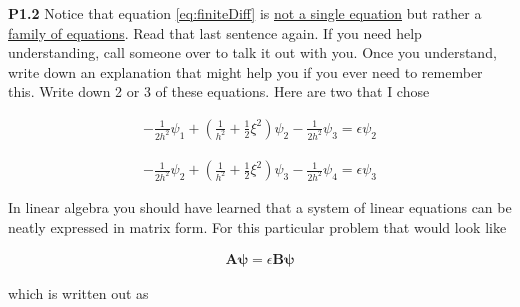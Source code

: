 \vspace{0.25in}
\noindent\makebox[\linewidth]{\rule{10cm}{0.4pt}}
\begin{flushright}
\begin{minipage}{0.9\linewidth}
  \noindent\textbf{P1.2} Notice that equation \eqref{eq:finiteDiff} is
  \underline{not a single equation} but rather a \underline{family of
    equations}.  Read that last sentence again.  If you need help
  understanding, call someone over to talk it out with you.  Once you
  understand, write down an explanation that might help you if you
  ever need to remember this.  Write down 2 or 3 of these
  equations. Here are two that I chose

\begin{align}
-\frac{1}{2 h^2}\psi_1 + (\frac{1}{h^2} + \frac{1}{2} \xi^2)\psi_2 - \frac{1}{2 h^2}\psi_3 = \epsilon \psi_2 
\end{align}

\begin{align}
-\frac{1}{2 h^2}\psi_2 + (\frac{1}{h^2} + \frac{1}{2} \xi^2)\psi_3 - \frac{1}{2 h^2}\psi_4 = \epsilon \psi_3 
\end{align}

\end{minipage}
\end{flushright}
\noindent\makebox[\linewidth]{\rule{10cm}{0.4pt}}
      

\vspace{0.25in} 

\noindent In linear algebra you should have learned that a
system of linear equations can be neatly expressed in matrix form.
For this particular problem that would look like

\begin{align}
\boldsymbol{A} \boldsymbol{\psi} = \epsilon \boldsymbol{B}\boldsymbol{\psi}
\end{align}

which is written out as

